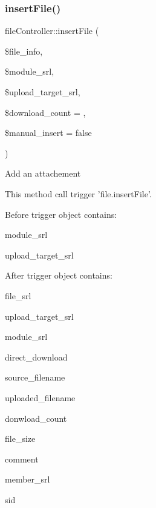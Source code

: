 \subsubsection{\texorpdfstring{insert\+File()}{insertFile()}}
{\footnotesize\ttfamily file\+Controller\+::insert\+File (\begin{DoxyParamCaption}\item[{}]{\$file\+\_\+info,  }\item[{}]{\$module\+\_\+srl,  }\item[{}]{\$upload\+\_\+target\+\_\+srl,  }\item[{}]{\$download\+\_\+count = {},  }\item[{}]{\$manual\+\_\+insert = {\ttfamily false} }\end{DoxyParamCaption})}

Add an attachement


\begin{DoxyPre}
This method call trigger 'file.insertFile'.\end{DoxyPre}



\begin{DoxyPre}Before trigger object contains:
\begin{DoxyItemize}
\item module\_srl
\item upload\_target\_srl
\end{DoxyItemize}\end{DoxyPre}



\begin{DoxyPre}After trigger object contains:
\begin{DoxyItemize}
\item file\_srl
\item upload\_target\_srl
\item module\_srl
\item direct\_download
\item source\_filename
\item uploaded\_filename
\item donwload\_count
\item file\_size
\item comment
\item member\_srl
\item sid

\end{DoxyItemize}\end{DoxyPre}



